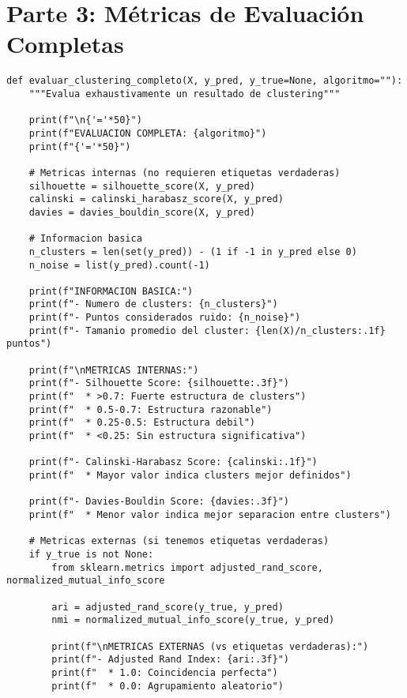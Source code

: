 \documentclass[12pt]{article}
\begin{document}
\section{Parte 3: Métricas de Evaluación Completas}

\begin{lstlisting}
def evaluar_clustering_completo(X, y_pred, y_true=None, algoritmo=""):
    """Evalua exhaustivamente un resultado de clustering"""
    
    print(f"\n{'='*50}")
    print(f"EVALUACION COMPLETA: {algoritmo}")
    print(f"{'='*50}")
    
    # Metricas internas (no requieren etiquetas verdaderas)
    silhouette = silhouette_score(X, y_pred)
    calinski = calinski_harabasz_score(X, y_pred)
    davies = davies_bouldin_score(X, y_pred)
    
    # Informacion basica
    n_clusters = len(set(y_pred)) - (1 if -1 in y_pred else 0)
    n_noise = list(y_pred).count(-1)
    
    print(f"INFORMACION BASICA:")
    print(f"- Numero de clusters: {n_clusters}")
    print(f"- Puntos considerados ruido: {n_noise}")
    print(f"- Tamanio promedio del cluster: {len(X)/n_clusters:.1f} puntos")
    
    print(f"\nMETRICAS INTERNAS:")
    print(f"- Silhouette Score: {silhouette:.3f}")
    print(f"  * >0.7: Fuerte estructura de clusters")
    print(f"  * 0.5-0.7: Estructura razonable")
    print(f"  * 0.25-0.5: Estructura debil")
    print(f"  * <0.25: Sin estructura significativa")
    
    print(f"- Calinski-Harabasz Score: {calinski:.1f}")
    print(f"  * Mayor valor indica clusters mejor definidos")
    
    print(f"- Davies-Bouldin Score: {davies:.3f}")
    print(f"  * Menor valor indica mejor separacion entre clusters")
    
    # Metricas externas (si tenemos etiquetas verdaderas)
    if y_true is not None:
        from sklearn.metrics import adjusted_rand_score, normalized_mutual_info_score
        
        ari = adjusted_rand_score(y_true, y_pred)
        nmi = normalized_mutual_info_score(y_true, y_pred)
        
        print(f"\nMETRICAS EXTERNAS (vs etiquetas verdaderas):")
        print(f"- Adjusted Rand Index: {ari:.3f}")
        print(f"  * 1.0: Coincidencia perfecta")
        print(f"  * 0.0: Agrupamiento aleatorio")
        

\end{lstlisting}
\end{document}
